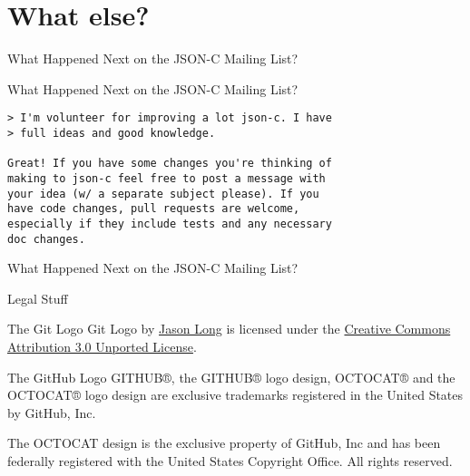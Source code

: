 \documentclass{beamer}
\begin{document}
\section*{What else?}

\begin{frame}{What Happened Next on the JSON-C Mailing List?}
\end{frame}

\begin{frame}[fragile]{What Happened Next on the JSON-C Mailing List?}
    \begin{verbatim}
> I'm volunteer for improving a lot json-c. I have
> full ideas and good knowledge.

Great! If you have some changes you're thinking of
making to json-c feel free to post a message with
your idea (w/ a separate subject please). If you
have code changes, pull requests are welcome,
especially if they include tests and any necessary
doc changes.
    \end{verbatim}
\end{frame}

\begin{frame}{What Happened Next on the JSON-C Mailing List?}
\end{frame}

\begin{frame}{Legal Stuff}
    \begin{block}{The Git Logo}
        Git Logo by \href{http://twitter.com/jasonlong}{Jason Long} is
        licensed under the
        \href{http://creativecommons.org/licenses/by/3.0/}{Creative Commons Attribution 3.0 Unported License}.
    \end{block}
    \begin{block}{The GitHub Logo}
        GITHUB®, the GITHUB® logo design, OCTOCAT® and the OCTOCAT® logo
        design are exclusive trademarks registered in the United States
        by GitHub, Inc.

        The OCTOCAT design is the exclusive property of GitHub, Inc and
        has been federally registered with the United States Copyright
        Office. All rights reserved.
    \end{block}
\end{frame}
\end{document}
